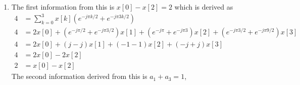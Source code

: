 \documentclass[10pt,a4paper, margin=1in]{article}
\begin{document}
\begin{enumerate}
\begin{enumerate}
    \item
    The first information from this is $x[0] - x[2] = 2$ which is derived as 
    \begin{equation}
    \begin{split}
    	4 & =\sum_{k = 0}^{3} x[k] \left( e^{-j\pi k/2} + e^{-j\pi 3k/2} \right) \\
	4 & =2x[0] + \left( e^{-j\pi /2} + e^{-j\pi 3/2} \right)x[1] + \left( e^{-j\pi} + e^{-j\pi 3} \right)x[2] + \left( e^{-j\pi 3/2} + e^{-j\pi 9/2} \right)x[3] \\
	4 &= 2x[0] + \left( j - j \right)x[1] + \left( -1 -1 \right)x[2] + \left( -j + j \right)x[3] \\
	4 &= 2x[0] - 2x[2]\\
	2 & = x[0] - x[2]
    \end{split}
    \end{equation}
    The second information derived from this is $a_1+a_3=1$,
    

\end{enumerate}
\end{enumerate}
\end{document}
